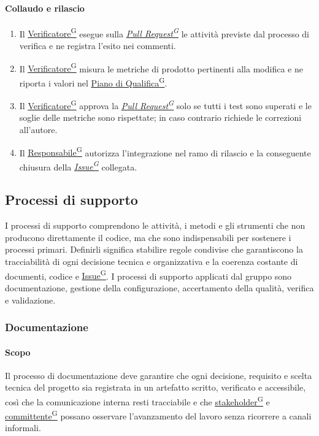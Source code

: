 \documentclass[a4paper,12pt]{article}
\providecommand{\glslink}[2]{\href{https://alittlebyte-19.github.io/Documentazione/glossario.html\#gls-#1}{\underline{#2}\textsuperscript{\scriptsize G}}}
\begin{document}
\paragraph{Collaudo e rilascio}
\begin{enumerate}
    \item Il \glslink{verificatore}{Verificatore} esegue sulla \textit{\glslink{pull-request}{Pull Request}} le attività previste dal processo di verifica e ne registra l'esito nei commenti.
    \item Il \glslink{verificatore}{Verificatore} misura le metriche di prodotto pertinenti alla modifica e ne riporta i valori nel \glslink{piano-di-qualifica}{Piano di Qualifica}.
    \item Il \glslink{verificatore}{Verificatore} approva la \textit{\glslink{pull-request}{Pull Request}} solo se tutti i test sono superati e le soglie delle metriche sono rispettate; in caso contrario richiede le correzioni all'autore.
    \item Il \glslink{responsabile}{Responsabile} autorizza l'integrazione nel ramo di rilascio e la conseguente chiusura della \textit{\glslink{issue}{Issue}} collegata.
\end{enumerate}

\subsection{Processi di supporto}
I processi di supporto comprendono le attività, i metodi e gli strumenti che non producono direttamente il codice, ma che sono indispensabili per sostenere i processi primari. Definirli significa stabilire regole condivise che garantiscono la tracciabilità di ogni decisione tecnica e organizzativa e la coerenza costante di documenti, codice e \glslink{issue}{Issue}. I processi di supporto applicati dal gruppo sono documentazione, gestione della configurazione, accertamento della qualità, verifica e validazione.

\subsubsection{Documentazione}

\paragraph{Scopo}
Il processo di documentazione deve garantire che ogni decisione, requisito e scelta tecnica del progetto sia registrata in un artefatto scritto, verificato e accessibile, così che la comunicazione interna resti tracciabile e che \glslink{stakeholder}{stakeholder} e \glslink{committente-proponente}{committente} possano osservare l'avanzamento del lavoro senza ricorrere a canali informali.
\end{document}
